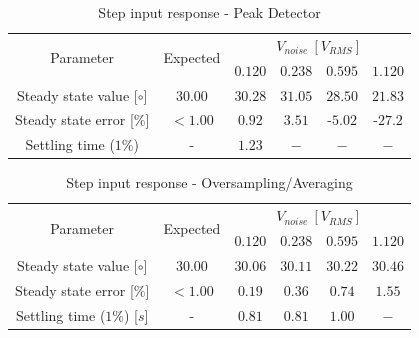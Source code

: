 \documentclass[conference]{IEEEtran}
\begin{document}
\begin{table}[h!]
\centering
\caption{Step input response - Peak Detector}
\label{tab:step_final_noise_peakdetector}
\begin{tabular}{|c|c|c|c|c|c|}
\hline
\multirow{2}{*}{Parameter} & \multirow{2}{*}{Expected}    & \multicolumn{4}{c|}{$V_{noise}~[V_{RMS}]$} \\ \cline{3-6} 
                           &                                 & $0.120$  & $0.238$  & $0.595$  & $1.120$  \\ \hline
Steady state value [${\circ}$]         & $30.00$	& $30.28$ & $31.05$  & $28.50$ & $21.83$ \\ \hline
Steady state error [$\%$]         & $<1.00$  		&  $0.92$       & $3.51$     & -$5.02$  & -$27.2$  \\ \hline
Settling time ($1\%$)      & - 				& $1.23$		& $-$				& $-$		& $-$			\\ \hline
\end{tabular}
\end{table}

\begin{table}[h!]
\centering
\caption{Step input response - Oversampling/Averaging}
\label{tab:step_final_noise_oversampling}
\begin{tabular}{|c|c|c|c|c|c|}
\hline
\multirow{2}{*}{Parameter} & \multirow{2}{*}{Expected}    & \multicolumn{4}{c|}{$V_{noise}~[V_{RMS}]$} \\ \cline{3-6} 
                           &                                 & $0.120$  & $0.238$  & $0.595$  & $1.120$  \\ \hline
Steady state value [${\circ}$]         & $30.00$	 &  $30.06$ & $30.11$     & $30.22$ & $30.46$ \\ \hline
Steady state error [$\%$]         & $<1.00$  		&  $0.19$       & $0.36$     &  $0.74$ & $1.55$   \\ \hline
Settling time ($1\%$) [$s$]			& - 		& $0.81$			& $0.81$		& $1.00$	& $-$			\\ \hline
\end{tabular}
\end{table}


%
%
\end{document}
